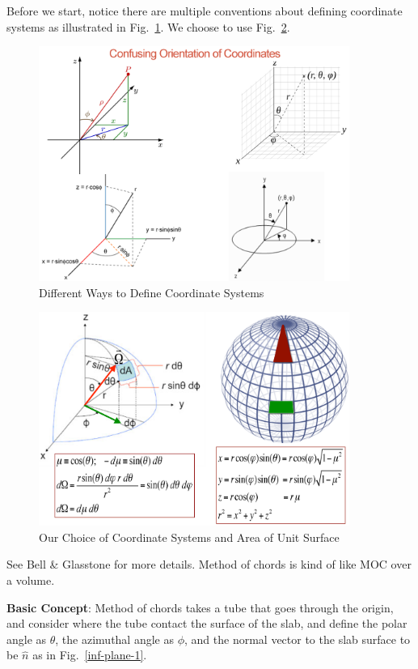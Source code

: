 \documentclass{school-22.211-notes}
\begin{document}
Before we start, notice there are multiple conventions about defining coordinate systems as illustrated in Fig.~\ref{all-coord}. We choose to use Fig.~\ref{coord-1}. 
\begin{figure}[h]
  \centering
  \includegraphics[width=4in]{images/pin/all-coord.png}
  \caption{Different Ways to Define Coordinate Systems} \label{all-coord}
\end{figure}
\begin{figure}[h]
  \centering
  \includegraphics[width=4in]{images/pin/coord-1.png}
  \caption{Our Choice of Coordinate Systems and Area of Unit Surface} \label{coord-1}
\end{figure}


\clearpage
{} %
See Bell \& Glasstone for more details. Method of chords is kind of like MOC over a volume. 

\textbf{Basic Concept}: Method of chords takes a tube that goes through the origin, and consider where the tube contact the surface of the slab, and define the polar angle as $\theta$, the azimuthal angle as $\phi$, and the normal vector to the slab surface to be $\hat{n}$ as in Fig.~\ref{inf-plane-1}. 
\end{document}
